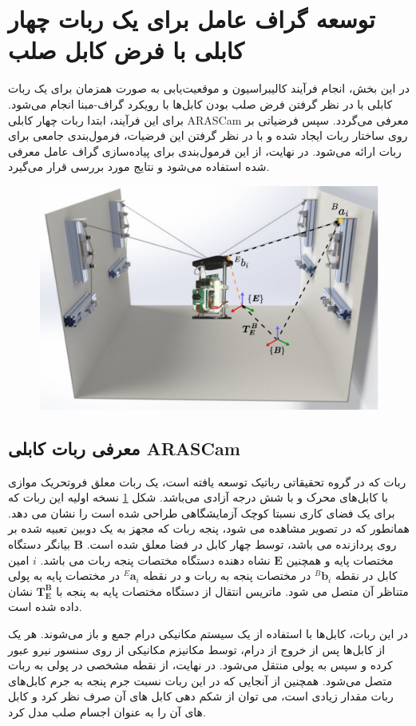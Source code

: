 \section{توسعه گراف عامل برای یک ربات چهار کابلی با فرض کابل صلب}
در این بخش، انجام فرآیند کالیبراسیون و موقعیت‌یابی به صورت همزمان برای یک ربات کابلی با در نظر گرفتن فرض صلب بودن کابل‌ها با رویکرد گراف-مبنا انجام می‌شود. برای این فرآیند، ابتدا ربات چهار کابلی ARASCam معرفی می‌گردد. سپس فرضیاتی بر روی ساختار ربات ایجاد شده و با در نظر گرفتن این فرضیات، فرمول‌بندی جامعی برای ربات ارائه می‌شود. در نهایت، از این فرمول‌بندی برای پیاده‌سازی گراف عامل معرفی شده استفاده می‌شود و نتایج مورد بررسی قرار می‌گیرد. 
\begin{figure}
	\centering
	\includegraphics[width=0.6\linewidth]{img/arascam}
	\caption{}
	\label{fig:arascam}
\end{figure}

\subsection{معرفی ربات کابلی ARASCam}
ربات  که در گروه تحقیقاتی رباتیک  توسعه یافته است، یک ربات معلق فروتحریک موازی با کابل‌های محرک و با شش درجه آزادی می‌باشد. شکل 
\ref{fig:arascam}
 نسخه اولیه این  ربات که برای یک فضای کاری نسبتا کوچک آزمایشگاهی طراحی شده است را نشان می دهد. همانطور که در تصویر مشاهده می شود، پنجه ربات که مجهز به یک دوبین تعبیه شده بر روی پردازنده 
می باشد، توسط چهار کابل در فضا معلق شده است. $\boldsymbol{B}$ بیانگر دستگاه مختصات پایه و همچنین $\boldsymbol{E}$ نشاه دهنده دستگاه مختصات پنجه ربات می باشد. $i$ امین کابل در نقطه ${}^B\!\boldsymbol{b}_i$ در مختصات پنجه به ربات و در نقطه ${}^E\!\boldsymbol{a}_i$ در مختصات پایه به پولی متناظر آن متصل می شود. ماتریس انتقال از دستگاه مختصات پایه به پنجه با 
$\boldsymbol{T}^{\boldsymbol{B}}_{\boldsymbol{E}}$
نشان داده شده است.


در این ربات، کابل‌ها با استفاده از یک سیستم مکانیکی درام جمع و باز می‌شوند. هر یک از کابل‌ها پس از خروج از درام، توسط مکانیزم مکانیکی از روی سنسور نیرو عبور کرده و سپس به پولی منتقل می‌شود. در نهایت، از نقطه مشخصی در پولی به ربات متصل می‌شود. همچنین از آنجایی که در این ربات نسبت جرم پنجه به جرم کابل‌های ربات مقدار زیادی است، می توان از شکم دهی کابل های آن صرف نظر کرد و کابل های آن را به عنوان اجسام صلب مدل کرد.

